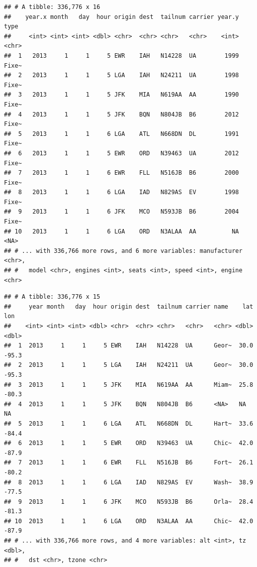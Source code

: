 \documentclass[]{book}
\newenvironment{Shaded}{\begin{snugshade}}{\end{snugshade}}
\newcommand{\CommentTok}[1]{\textcolor[rgb]{0.56,0.35,0.01}{\textit{#1}}}
\newcommand{\DataTypeTok}[1]{\textcolor[rgb]{0.13,0.29,0.53}{#1}}
\newcommand{\KeywordTok}[1]{\textcolor[rgb]{0.13,0.29,0.53}{\textbf{#1}}}
\newcommand{\NormalTok}[1]{#1}
\newcommand{\OperatorTok}[1]{\textcolor[rgb]{0.81,0.36,0.00}{\textbf{#1}}}
\newcommand{\StringTok}[1]{\textcolor[rgb]{0.31,0.60,0.02}{#1}}
\theoremstyle{definition}
\theoremstyle{definition}
\theoremstyle{definition}
\theoremstyle{remark}
\begin{document}
\begin{verbatim}
## # A tibble: 336,776 x 16
##    year.x month   day  hour origin dest  tailnum carrier year.y type 
##     <int> <int> <int> <dbl> <chr>  <chr> <chr>   <chr>    <int> <chr>
##  1   2013     1     1     5 EWR    IAH   N14228  UA        1999 Fixe~
##  2   2013     1     1     5 LGA    IAH   N24211  UA        1998 Fixe~
##  3   2013     1     1     5 JFK    MIA   N619AA  AA        1990 Fixe~
##  4   2013     1     1     5 JFK    BQN   N804JB  B6        2012 Fixe~
##  5   2013     1     1     6 LGA    ATL   N668DN  DL        1991 Fixe~
##  6   2013     1     1     5 EWR    ORD   N39463  UA        2012 Fixe~
##  7   2013     1     1     6 EWR    FLL   N516JB  B6        2000 Fixe~
##  8   2013     1     1     6 LGA    IAD   N829AS  EV        1998 Fixe~
##  9   2013     1     1     6 JFK    MCO   N593JB  B6        2004 Fixe~
## 10   2013     1     1     6 LGA    ORD   N3ALAA  AA          NA <NA> 
## # ... with 336,766 more rows, and 6 more variables: manufacturer <chr>,
## #   model <chr>, engines <int>, seats <int>, speed <int>, engine <chr>
\end{verbatim}

\begin{Shaded}
\end{Shaded}

\begin{verbatim}
## # A tibble: 336,776 x 15
##     year month   day  hour origin dest  tailnum carrier name    lat   lon
##    <int> <int> <int> <dbl> <chr>  <chr> <chr>   <chr>   <chr> <dbl> <dbl>
##  1  2013     1     1     5 EWR    IAH   N14228  UA      Geor~  30.0 -95.3
##  2  2013     1     1     5 LGA    IAH   N24211  UA      Geor~  30.0 -95.3
##  3  2013     1     1     5 JFK    MIA   N619AA  AA      Miam~  25.8 -80.3
##  4  2013     1     1     5 JFK    BQN   N804JB  B6      <NA>   NA    NA  
##  5  2013     1     1     6 LGA    ATL   N668DN  DL      Hart~  33.6 -84.4
##  6  2013     1     1     5 EWR    ORD   N39463  UA      Chic~  42.0 -87.9
##  7  2013     1     1     6 EWR    FLL   N516JB  B6      Fort~  26.1 -80.2
##  8  2013     1     1     6 LGA    IAD   N829AS  EV      Wash~  38.9 -77.5
##  9  2013     1     1     6 JFK    MCO   N593JB  B6      Orla~  28.4 -81.3
## 10  2013     1     1     6 LGA    ORD   N3ALAA  AA      Chic~  42.0 -87.9
## # ... with 336,766 more rows, and 4 more variables: alt <int>, tz <dbl>,
## #   dst <chr>, tzone <chr>
\end{verbatim}
\end{document}
